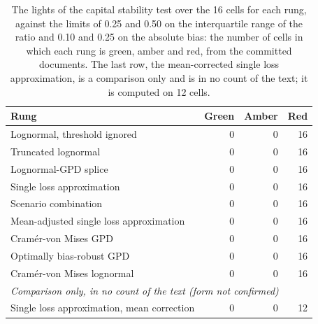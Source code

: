 \begin{table}[htbp]
\centering\small
\caption{The lights of the capital stability test over the 16 cells for each rung, against the limits of 0.25 and 0.50 on the interquartile range of the ratio and 0.10 and 0.25 on the absolute bias: the number of cells in which each rung is green, amber and red, from the committed documents. The last row, the mean-corrected single loss approximation, is a comparison only and is in no count of the text; it is computed on 12 cells.}
\label{tab:lights}
\begin{tabular}{lrrr}
\toprule
Rung & Green & Amber & Red \\
\midrule
Lognormal, threshold ignored & 0 & 0 & 16 \\
Truncated lognormal & 0 & 0 & 16 \\
Lognormal-GPD splice & 0 & 0 & 16 \\
Single loss approximation & 0 & 0 & 16 \\
Scenario combination & 0 & 0 & 16 \\
Mean-adjusted single loss approximation & 0 & 0 & 16 \\
Cram\'er-von Mises GPD & 0 & 0 & 16 \\
Optimally bias-robust GPD & 0 & 0 & 16 \\
Cram\'er-von Mises lognormal & 0 & 0 & 16 \\
\midrule
\multicolumn{4}{l}{\emph{Comparison only, in no count of the text (form not confirmed)}} \\
Single loss approximation, mean correction & 0 & 0 & 12 \\
\bottomrule
\end{tabular}
\end{table}
